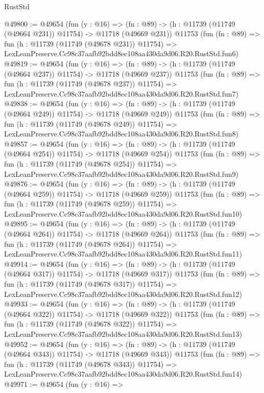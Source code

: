 \begin{lexlean}{RustStd}
\begin{coremodule}
@49800 := @49654
    (fun (y : @16) =>
    (fn : @89) -> (h : @11739 (@11749 (@49664 @231)) @11754) -> @11718 (@49669 @231))
    @11753
    (fun (fn : @89) =>
    fun (h : @11739 (@11749 (@49678 @231)) @11754) =>
    LexLeanPreserve.Cc98c37aafb92bdd8ec108aa430da9d06.R20.RustStd.fun6)
@49819 := @49654
    (fun (y : @16) =>
    (fn : @89) -> (h : @11739 (@11749 (@49664 @237)) @11754) -> @11718 (@49669 @237))
    @11753
    (fun (fn : @89) =>
    fun (h : @11739 (@11749 (@49678 @237)) @11754) =>
    LexLeanPreserve.Cc98c37aafb92bdd8ec108aa430da9d06.R20.RustStd.fun7)
@49838 := @49654
    (fun (y : @16) =>
    (fn : @89) -> (h : @11739 (@11749 (@49664 @249)) @11754) -> @11718 (@49669 @249))
    @11753
    (fun (fn : @89) =>
    fun (h : @11739 (@11749 (@49678 @249)) @11754) =>
    LexLeanPreserve.Cc98c37aafb92bdd8ec108aa430da9d06.R20.RustStd.fun8)
@49857 := @49654
    (fun (y : @16) =>
    (fn : @89) -> (h : @11739 (@11749 (@49664 @254)) @11754) -> @11718 (@49669 @254))
    @11753
    (fun (fn : @89) =>
    fun (h : @11739 (@11749 (@49678 @254)) @11754) =>
    LexLeanPreserve.Cc98c37aafb92bdd8ec108aa430da9d06.R20.RustStd.fun9)
@49876 := @49654
    (fun (y : @16) =>
    (fn : @89) -> (h : @11739 (@11749 (@49664 @259)) @11754) -> @11718 (@49669 @259))
    @11753
    (fun (fn : @89) =>
    fun (h : @11739 (@11749 (@49678 @259)) @11754) =>
    LexLeanPreserve.Cc98c37aafb92bdd8ec108aa430da9d06.R20.RustStd.fun10)
@49895 := @49654
    (fun (y : @16) =>
    (fn : @89) -> (h : @11739 (@11749 (@49664 @264)) @11754) -> @11718 (@49669 @264))
    @11753
    (fun (fn : @89) =>
    fun (h : @11739 (@11749 (@49678 @264)) @11754) =>
    LexLeanPreserve.Cc98c37aafb92bdd8ec108aa430da9d06.R20.RustStd.fun11)
@49914 := @49654
    (fun (y : @16) =>
    (fn : @89) -> (h : @11739 (@11749 (@49664 @317)) @11754) -> @11718 (@49669 @317))
    @11753
    (fun (fn : @89) =>
    fun (h : @11739 (@11749 (@49678 @317)) @11754) =>
    LexLeanPreserve.Cc98c37aafb92bdd8ec108aa430da9d06.R20.RustStd.fun12)
@49933 := @49654
    (fun (y : @16) =>
    (fn : @89) -> (h : @11739 (@11749 (@49664 @322)) @11754) -> @11718 (@49669 @322))
    @11753
    (fun (fn : @89) =>
    fun (h : @11739 (@11749 (@49678 @322)) @11754) =>
    LexLeanPreserve.Cc98c37aafb92bdd8ec108aa430da9d06.R20.RustStd.fun13)
@49952 := @49654
    (fun (y : @16) =>
    (fn : @89) -> (h : @11739 (@11749 (@49664 @343)) @11754) -> @11718 (@49669 @343))
    @11753
    (fun (fn : @89) =>
    fun (h : @11739 (@11749 (@49678 @343)) @11754) =>
    LexLeanPreserve.Cc98c37aafb92bdd8ec108aa430da9d06.R20.RustStd.fun14)
@49971 := @49654
    (fun (y : @16) =>

\end{coremodule}
\end{lexlean}

